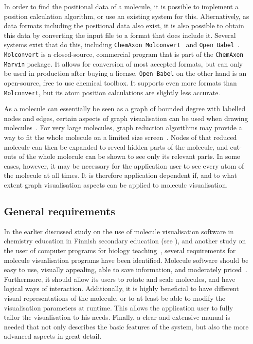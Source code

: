 In order to find the positional data of a molecule, it is possible to implement a position calculation algorithm, or use an existing system for this. Alternatively, as data formats including the positional data also exist, it is also possible to obtain this data by converting the input file to a format that does include it. Several systems exist that do this, including \verb|ChemAxon Molconvert|~\cite{chemaxon2014molecule} and \verb|Open Babel|~\cite{oboyle2011open}. \verb|Molconvert| is a closed-source, commercial program that is part of the \verb|ChemAxon Marvin| package. It allows for conversion of most accepted formats, but can only be used in production after buying a license. \verb|Open Babel| on the other hand is an open-source, free to use chemical toolbox. It supports even more formats than \verb|Molconvert|, but its atom position calculations are slightly less accurate.

As a molecule can essentially be seen as a graph of bounded degree with labelled nodes and edges, certain aspects of graph visualisation can be used when drawing molecules~\cite{boissonnat2001structure}. For very large molecules, graph reduction algorithms may provide a way to fit the whole molecule on a limited size screen~\cite{batagelj2004pajek}. Nodes of that reduced molecule can then be expanded to reveal hidden parts of the molecule, and cut-outs of the whole molecule can be shown to see only its relevant parts. In some cases, however, it may be necessary for the application user to see every atom of the molecule at all times. It is therefore application dependent if, and to what extent graph visualisation aspects can be applied to molecule visualisation.


\subsection{General requirements}
In the earlier discussed study on the use of molecule visualisation software in chemistry education in Finnish secondary education (see ), and another study on the user of computer programs for biology teaching~\cite{taylor2013interface}, several requirements for molecule visualisation programs have been identified. Molecule software should be easy to use, visually appealing, able to save information, and moderately priced~\cite{aksela2008computer}. Furthermore, it should allow its users to rotate and scale molecules, and have logical ways of interaction. Additionally, it is highly beneficial to have different visual representations of the molecule, or to at least be able to modify the visualisation parameters at runtime. This allows the application user to fully tailor the visualisation to his needs. Finally, a clear and extensive manual is needed that not only describes the basic features of the system, but also the more advanced aspects in great detail.



